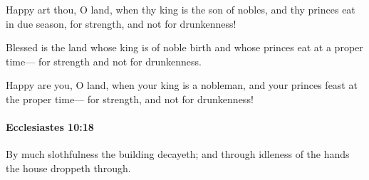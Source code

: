 			\begin{versebox}
					\item[BHS] 
					\item[LXX] 
					\item[ASV] Happy art thou, O land, when thy king is the son of nobles, and thy princes eat in due season, for strength, and not for drunkenness!
					\item[NIV] Blessed is the land whose king is of noble birth and whose princes eat at a proper time— for strength and not for drunkenness.
					\item[NRSV] Happy are you, O land, when your king is a nobleman, and your princes feast at the proper time— for strength, and not for drunkenness!
			\end{versebox}

		\paragraph{Ecclesiastes 10:18} %
			\label{ECCLESIASTES-10-18}

			By much slothfulness the building decayeth; and through idleness of the hands the house droppeth through.

